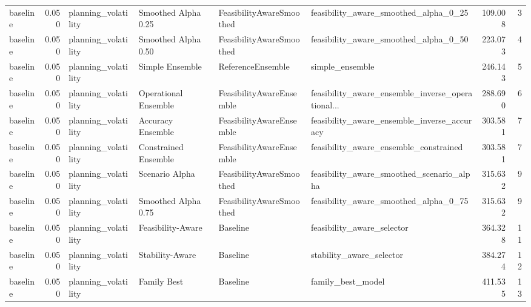 \begin{table}
{\begin{tabular}{lrllllrr}
      baseline &             0.050 &         planning\_volatility &   Smoothed Alpha 0.25 &  FeasibilityAwareSmoothed &              feasibility\_aware\_smoothed\_alpha\_0\_25 &       109.008 &               3 \\
      baseline &             0.050 &         planning\_volatility &   Smoothed Alpha 0.50 &  FeasibilityAwareSmoothed &              feasibility\_aware\_smoothed\_alpha\_0\_50 &       223.073 &               4 \\
      baseline &             0.050 &         planning\_volatility &       Simple Ensemble &         ReferenceEnsemble &                                    simple\_ensemble &       246.143 &               5 \\
      baseline &             0.050 &         planning\_volatility &  Operational Ensemble &  FeasibilityAwareEnsemble &  feasibility\_aware\_ensemble\_inverse\_operational... &       288.690 &               6 \\
      baseline &             0.050 &         planning\_volatility &     Accuracy Ensemble &  FeasibilityAwareEnsemble &        feasibility\_aware\_ensemble\_inverse\_accuracy &       303.581 &               7 \\
      baseline &             0.050 &         planning\_volatility &  Constrained Ensemble &  FeasibilityAwareEnsemble &             feasibility\_aware\_ensemble\_constrained &       303.581 &               7 \\
      baseline &             0.050 &         planning\_volatility &        Scenario Alpha &  FeasibilityAwareSmoothed &          feasibility\_aware\_smoothed\_scenario\_alpha &       315.632 &               9 \\
      baseline &             0.050 &         planning\_volatility &   Smoothed Alpha 0.75 &  FeasibilityAwareSmoothed &              feasibility\_aware\_smoothed\_alpha\_0\_75 &       315.632 &               9 \\
      baseline &             0.050 &         planning\_volatility &     Feasibility-Aware &                  Baseline &                         feasibility\_aware\_selector &       364.328 &              11 \\
      baseline &             0.050 &         planning\_volatility &       Stability-Aware &                  Baseline &                           stability\_aware\_selector &       384.274 &              12 \\
      baseline &             0.050 &         planning\_volatility &           Family Best &                  Baseline &                                  family\_best\_model &       411.535 &              13 \\

\end{tabular}}
\end{table}
